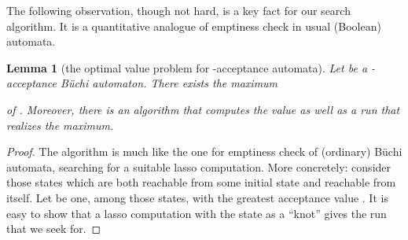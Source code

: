\documentclass[a4paper,USenglish,numberwithinsect]{lipics}
\newif\ifignore \ignorefalse
\newcommand{\auxproof}[1]{
\ifignore\mbox{}\newline
\textbf{BEGIN: AUX-PROOF} \dotfill\newline
{#1}\mbox{}\newline
\textbf{END: AUX-PROOF}\dotfill\newline
\fi}
\theoremstyle{definition}
\theoremstyle{remark}
\theoremstyle{plain}
\newtheorem{lem}[defi]{Lemma}
\begin{document}
The following observation, though not hard, is a key fact for
our search algorithm. 
It is a quantitative
 analogue
of emptiness check in usual (Boolean) automata.
\begin{lem}[the optimal value problem for {}-acceptance automata]\label{lem:lassoOptimalityForQuantitativeAcceptAutom}
  Let  be a {}-acceptance B\"uchi automaton.
There exists the maximum
 
 of .
Moreover, 
there is an algorithm that computes 
the value  
as well as a run  
that realizes the maximum.


\end{lem}
\auxproof{Note that
existence of 
 (as opposed to a supremum)
is nontrivial.
}
\begin{proof}
 The algorithm is much like the one for emptiness check of (ordinary)
B\"uchi automata, searching for a suitable lasso computation. More
concretely: consider those states  which are both reachable from some
initial state and reachable from  itself. Let  be one, among those
 states, with the
greatest acceptance value . It is easy to show that a lasso
computation with the state  as a ``knot'' gives the run
 that we seek for.
\end{proof}
\end{document}
